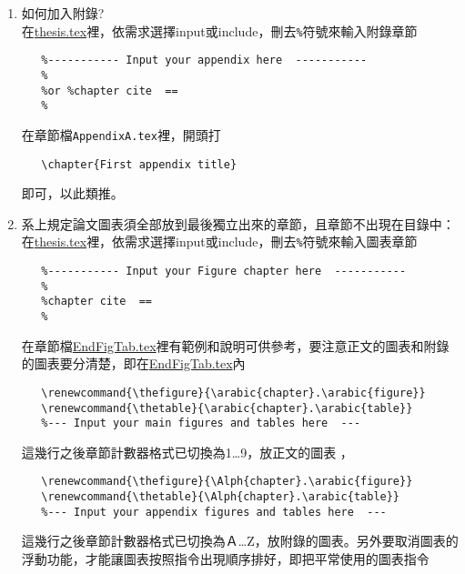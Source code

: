 \begin{acknowledgementsCH}
\begin{enumerate}[leftmargin=0pt, topsep=0pt, itemsep=0pt, label=\Roman{*}.]
\begin{enumerate}[topsep=0pt, itemsep=0pt, label=$\bullet$]
       \begin{verbatim}
   \documentclass[a4paper, 12pt, oneside]{book}
   改成
   \documentclass[a4paper, 12pt, twoside]{book}
       \end{verbatim}
           \item 如何加入附錄?\\
       在\href{run:./thesis.tex}{thesis.tex}裡，依需求選擇input或include，刪去\texttt{\%}符號來輸入附錄章節
       \begin{verbatim}
   %----------- Input your appendix here  -----------
   %
   %or %chapter cite  == 
   %
       \end{verbatim}
       在章節檔\texttt{AppendixA.tex}裡，開頭打
       \begin{verbatim}
   \chapter{First appendix title}
       \end{verbatim}
       即可，以此類推。    
           \item 系上規定論文圖表須全部放到最後獨立出來的章節，且章節不出現在目錄中：\\
       在\href{run:./thesis.tex}{thesis.tex}裡，依需求選擇input或include，刪去\texttt{\%}符號來輸入圖表章節
       \begin{verbatim}    
   %----------- Input your Figure chapter here  -----------
   % 
   %chapter cite  == 
   %
       \end{verbatim}
       在章節檔\href{run:./EndFigTab.tex}{EndFigTab.tex}裡有範例和說明可供參考，要注意正文的圖表和附錄的圖表要分清楚，即在\href{run:./EndFigTab.tex}{EndFigTab.tex}內
       \begin{verbatim}    
   \renewcommand{\thefigure}{\arabic{chapter}.\arabic{figure}} 
   \renewcommand{\thetable}{\arabic{chapter}.\arabic{table}} 
   %--- Input your main figures and tables here  ---
       \end{verbatim}
       這幾行之後章節計數器格式已切換為1\dots 9，放正文的圖表 ，
        \begin{verbatim}    
   \renewcommand{\thefigure}{\Alph{chapter}.\arabic{figure}} 
   \renewcommand{\thetable}{\Alph{chapter}.\arabic{table}}
   %--- Input your appendix figures and tables here  ---
       \end{verbatim}
       這幾行之後章節計數器格式已切換為Ａ\dots Z，放附錄的圖表。另外要取消圖表的浮動功能，才能讓圖表按照指令出現順序排好，即把平常使用的圖表指令

\end{enumerate}
\end{enumerate}
\end{acknowledgementsCH}
